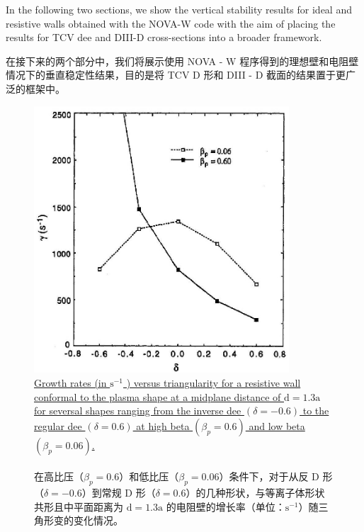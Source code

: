 \documentclass[utf8]{ctexart}
\newcommand\enzhbox[2]{
  	\quad\par \begin{paracol}{2} \colseprulecolor{black} 
  		\begin{spacing}{1.0}
  			\footnotesize  #1
  		\end{spacing}
  		\switchcolumn[1] 
  		#2
  	\end{paracol} \quad\par
  }
\begin{document}
\begin{sloppypar}
 
\enzhbox{  In the following two sections, we show the vertical stability results for ideal and resistive walls obtained with the NOVA-W code with the aim of placing the results for TCV dee and DIII-D cross-sections into a broader framework.}{
在接下来的两个部分中，我们将展示使用 NOVA - W 程序得到的理想壁和电阻壁情况下的垂直稳定性结果，目的是将 TCV D 形和 DIII - D 截面的结果置于更广泛的框架中。 }
  \begin{figure}[H]
  	\centering
  	\includegraphics[max width=0.85\textwidth,max height=0.3\textheight]{2025_01_10_a0135324997886412d98g-6}
 \caption{\uline{Growth rates (in $\mathrm{s}^{-1}$ ) versus triangularity for a resistive wall conformal to the plasma shape at a midplane distance of $\mathrm{d}=1.3 \mathrm{a}$ for seversal shapes ranging from the inverse dee $(\delta=-0.6)$ to the regular dee $(\delta=0.6)$ at high beta $\left(\beta_{p}=0.6\right)$ and low beta $\left(\beta_{p}=0.06\right)$.\\}\\在高比压（$\beta_{p}=0.6$）和低比压（$\beta_{p}=0.06$）条件下，对于从反 D 形（$\delta = - 0.6$）到常规 D 形（$\delta = 0.6$）的几种形状，与等离子体形状共形且中平面距离为 $\mathrm{d}=1.3 \mathrm{a}$ 的电阻壁的增长率（单位：$\mathrm{s}^{-1}$）随三角形变的变化情况。 }
  	\label{fig4.}
  \end{figure}
  

\end{sloppypar}
\end{document}

